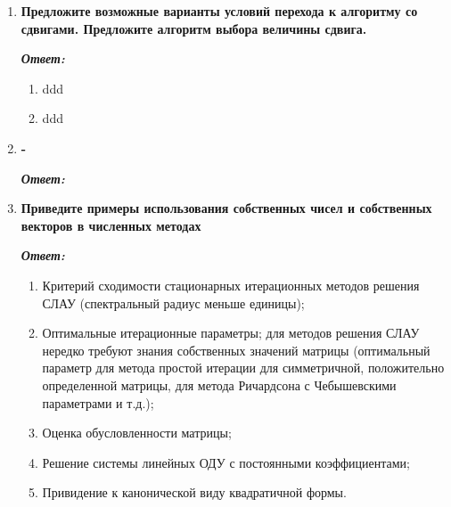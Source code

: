 \documentclass[12pt, a4paper]{article}
\begin{document}
\begin{enumerate}
	\item \textbf{ Предложите возможные варианты условий перехода к алгоритму со сдвигами. Предложите алгоритм выбора величины сдвига.}
	\vspace*{0.2cm}
	
	\textit{\textbf{Ответ:}}
	\begin{enumerate}
		\item ddd
		\item ddd
	\end{enumerate}
	
	
	\item \textbf{-}
	\vspace*{0.2cm}
	
	\textit{\textbf{Ответ:}}
	
	\item \textbf{Приведите примеры использования собственных чисел и собственных векторов в численных методах}
	\vspace*{0.2cm}
	
	\textit{\textbf{Ответ:}}
	\begin{enumerate}
		\item Критерий сходимости стационарных итерационных методов решения СЛАУ (спектральный радиус меньше единицы); 
		\item Оптимальные итерационные параметры; для методов решения СЛАУ нередко требуют знания собственных значений матрицы (оптимальный параметр для метода простой итерации для симметричной, положительно определенной матрицы, для метода Ричардсона с Чебышевскими параметрами и т.д.);
		\item Оценка обусловленности матрицы;
		\item Решение системы линейных ОДУ с постоянными коэффициентами; 
		\item Привидение к канонической виду квадратичной формы. 
	\end{enumerate}
	
	\end{enumerate}
\end{document}
